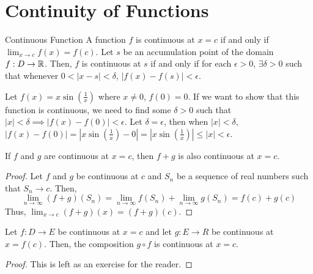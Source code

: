 \section{Continuity of Functions}
\begin{definition}{Continuous Function}{}
    A function $f$ is continuous at $x = c$ if and only if $\lim_{x \to c} f(x) = f(c)$. Let $s$ be an accumulation point of the domain $f:D \to \mathbb{R}$. Then, $f$ is continuous at $s$ if and only if for each $\epsilon > 0$, $\exists \delta > 0$ such that whenever $0 < |x - s| < \delta$, $|f(x) - f(s)| < \epsilon$.
\end{definition}
\begin{note}
    Let $f(x) = x\sin(\frac{1}{x})$ where $x \neq 0$, $f(0) = 0$. If we want to show that this function is continuous, we need to find some $\delta > 0$ such that $|x| < \delta \implies |f(x) - f(0)| < \epsilon$. Let $\delta = \epsilon$, then when $|x| < \delta$, $|f(x) - f(0)| = |x\sin(\frac{1}{x}) - 0| = |x\sin(\frac{1}{x})| \leq |x| < \epsilon$.
\end{note}

\begin{theorem}{}{}
    If $f$ and $g$ are continuous at $x = c$, then $f + g$ is also continuous at $x = c$.
\end{theorem}
\begin{proof}
    Let $f$ and $g$ be continuous at $c$ and $S_n$ be a sequence of real numbers such that $S_n \to c$. Then, $$\lim_{n \to \infty} (f + g)(S_n) = \lim_{n \to \infty} f(S_n) + \lim_{n \to \infty} g(S_n) = f(c) + g(c)$$ Thus, $\lim_{x \to c} (f + g)(x) = (f + g)(c)$.
\end{proof}

\begin{theorem}{}{}
    Let $f:D \to E$ be continuous at $x = c$ and let $g:E \to R$ be continuous at $x = f(c)$. Then, the composition $g \circ f$ is continuous at $x = c$.
\end{theorem}
\begin{proof}
    This is left as an exercise for the reader.
\end{proof}